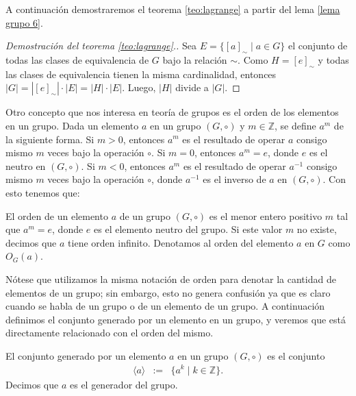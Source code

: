 A continuación demostraremos el teorema \ref{teo:lagrange} a partir del lema \ref{lema grupo 6}.
\begin{proof}[Demostración del teorema \ref{teo:lagrange}.]
Sea $E = \{[a]_{\sim}\mid a\in G\}$ el conjunto de todas las clases de equivalencia de $G$ bajo la relación $\sim$. Como $H = [e]_{\sim}$ y todas las clases de equivalencia tienen la misma cardinalidad, entonces $|G| = |[e]_{\sim}|\cdot |E| = |H|\cdot |E|$. Luego, $|H|$ divide a $|G|$. 

\end{proof}

Otro concepto que nos interesa en teoría de grupos es el orden de los
elementos en un grupo.  Dada un elemento $a$ en un grupo $(G,\circ)$ y
$m \in \mathbb{Z}$, se define $a^m$ de la siguiente forma. Si $m > 0$,
entonces $a^m$ es el resultado de operar $a$ consigo mismo $m$ veces
bajo la operación $\circ$. Si $m = 0$, entonces $a^m = e$, donde $e$
es el neutro en $(G,\circ)$. Si $m < 0$, entonces $a^m$ es el
resultado de operar $a^{-1}$ consigo mismo $m$ veces bajo la operación
$\circ$, donde $a^{-1}$ es el inverso de $a$ en $(G, \circ)$. Con esto
tenemos que:

\begin{definition}\label{def_orden}
	El orden de un elemento $a$ de un grupo $(G,\circ)$ es el menor entero positivo $m$ tal que $a^m = e$, donde
        $e$ es el elemento neutro del grupo. Si este valor $m$ no existe, decimos que $a$ tiene orden infinito. Denotamos al orden del elemento $a$ en $G$ como $O_G(a)$.
\end{definition} 
Nótese que utilizamos la misma notación de orden para denotar la cantidad de elementos de un grupo; sin embargo, esto no genera confusión ya que es claro cuando se habla de un grupo o de un elemento de un grupo. 
A continuación definimos el conjunto generado por un elemento en un grupo, y veremos que está directamente relacionado con el orden del mismo. 
 
\begin{definition}\label{def_gen}
	El conjunto generado por un elemento $a$ en un grupo $(G,\circ)$ es el conjunto
        \begin{eqnarray*}
        \langle a\rangle & := & \{a^k\mid k\in\mathbb{Z}\}.
        \end{eqnarray*}
        Decimos que $a$ es el generador del grupo.
\end{definition}

